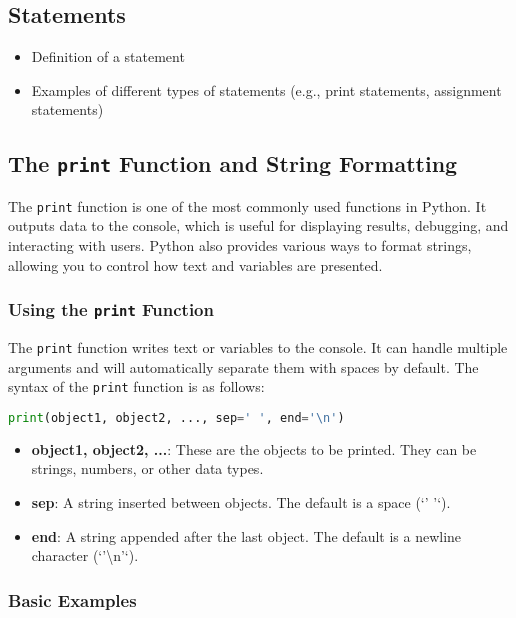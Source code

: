 \subsection{Statements}
\begin{itemize}
    \item Definition of a statement
    \item Examples of different types of statements (e.g., print statements, assignment statements)
\end{itemize}

\subsection{The \texttt{print} Function and String Formatting}

The \texttt{print} function is one of the most commonly used functions in Python. It outputs data to the console, which is useful for displaying results, debugging, and interacting with users. Python also provides various ways to format strings, allowing you to control how text and variables are presented.

\subsubsection{Using the \texttt{print} Function}

The \texttt{print} function writes text or variables to the console. It can handle multiple arguments and will automatically separate them with spaces by default. The syntax of the \texttt{print} function is as follows:

\begin{lstlisting}[language=Python, caption=Basic Usage of \texttt{print}]
print(object1, object2, ..., sep=' ', end='\n')
\end{lstlisting}

\begin{itemize}
    \item \textbf{object1, object2, ...}: These are the objects to be printed. They can be strings, numbers, or other data types.
    \item \textbf{sep}: A string inserted between objects. The default is a space (`' '`).
    \item \textbf{end}: A string appended after the last object. The default is a newline character (`'\textbackslash n'`).
\end{itemize}

\subsubsection{Basic Examples}

